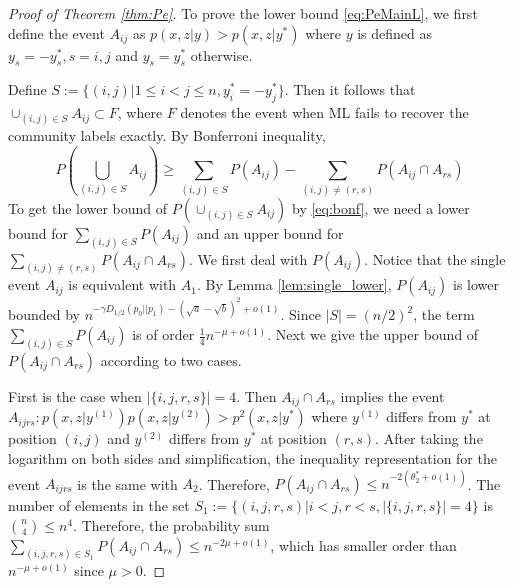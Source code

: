 \documentclass[conference,letterpaper]{IEEEtran}
\begin{document}
\begin{proof}[Proof of Theorem \ref{thm:Pe}]
To prove the lower bound \eqref{eq:PeMainL},
we first define the event $A_{ij}$ as
$p(x,z|y) > p(x,z|y^*)$ where $y$ is defined as
$y_s=-y^*_s, s=i,j$ and $y_s=y^*_s$ otherwise.

Define $S:=\{(i,j)| 1\leq i < j\leq n,
y_i^*=-y_j^*
\}$.
Then it follows that $\cup_{(i,j) \in S} A_{ij} \subset F$, where $F$ denotes the event when ML fails to recover the community labels exactly.
By Bonferroni inequality,
\begin{equation}\label{eq:bonf}
	P(\bigcup_{(i,j)\in S} A_{ij}) \geq
	\sum_{(i,j)\in S} P(A_{ij})
	- \sum_{(i,j) \neq (r,s)} P(A_{ij} \cap A_{rs})		
\end{equation}
To get the lower bound of
$P(\cup_{(i,j)\in S} A_{ij})$ by
\eqref{eq:bonf},
we need a lower bound for $\sum_{(i,j)\in S} P(A_{ij})$
and an upper bound for
$\sum_{(i,j) \neq (r,s)} P(A_{ij} \cap A_{rs})$.
We first deal with $P(A_{ij})$.
Notice that the single event $A_{ij}$
is equivalent with $A_1$.
By Lemma \ref{lem:single_lower},
$P(A_{ij})$ is lower bounded by
$n^{-\gamma D_{1/2}(p_0 || p_1)-(\sqrt{a} - \sqrt{b})^2 +o(1)}$.
Since $|S|=(n/2)^2$, the term $\sum_{(i,j) \in S} P(A_{ij})$ is of order $\frac{1}{4}n^{-\mu+o(1)}$.
Next we give the upper bound of $P(A_{ij} \cap A_{rs})$ according to two cases.

First is the case when $|\{i,j,r,s\}|=4$. Then $A_{ij} \cap A_{rs}$ implies the event
$A_{ijrs}: p(x,z|y^{(1)})p(x,z|y^{(2)}) > p^2(x,z|y^*)$ where
$y^{(1)}$ differs from $y^*$ at position $(i,j)$ and $y^{(2)}$ differs from $y^*$
at position $(r,s)$.
After taking the logarithm on both sides and simplification,
the inequality representation for the event $A_{ijrs}$ is the same with $A_2$.
Therefore, $P(A_{ij} \cap A_{rs}) \leq n^{-2(\theta^*_2 + o(1))} $. The number of elements
in the set $S_1:=\{(i,j,r,s)| i<j, r<s, |\{i,j,r,s\}|=4\}$ is $\binom{n}{4} \leq n^4$.
Therefore, the probability sum
$\sum_{(i,j,r,s) \in S_1} P(A_{ij} \cap A_{rs})
\leq n^{-2\mu +o(1)}$,
which has smaller order than $n^{-\mu+o(1)}$ since $\mu > 0$.


\end{proof}
\end{document}
